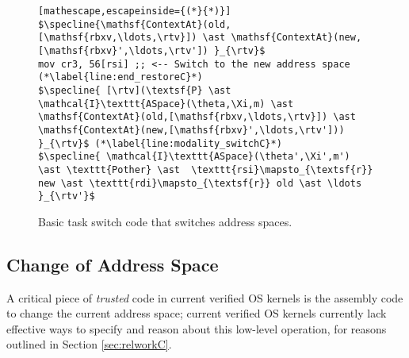 \begin{figure}
\begin{lstlisting}[mathescape,escapeinside={(*}{*)}]
$\specline{\mathsf{ContextAt}(old,[\mathsf{rbxv,\ldots,\rtv}]) \ast \mathsf{ContextAt}(new,[\mathsf{rbxv}',\ldots,\rtv']) }_{\rtv}$
mov cr3, 56[rsi] ;; <-- Switch to the new address space (*\label{line:end_restoreC}*)
$\specline{ [\rtv](\textsf{P} \ast \mathcal{I}\texttt{ASpace}(\theta,\Xi,m) \ast \mathsf{ContextAt}(old,[\mathsf{rbxv,\ldots,\rtv}]) \ast \mathsf{ContextAt}(new,[\mathsf{rbxv}',\ldots,\rtv']))  }_{\rtv}$ (*\label{line:modality_switchC}*)
$\specline{ \mathcal{I}\texttt{ASpace}(\theta',\Xi',m') \ast \texttt{Pother} \ast  \texttt{rsi}\mapsto_{\textsf{r}} new \ast \texttt{rdi}\mapsto_{\textsf{r}} old \ast \ldots }_{\rtv'}$
\end{lstlisting}
\vspace{-1em}
\caption{Basic task switch code that switches address spaces.}
\label{fig:swtchC}
\end{figure}

\subsection{Change of Address Space}
A critical piece of \emph{trusted} code in current verified OS kernels is the assembly code to change the current address space; current verified OS kernels currently
lack effective ways to specify and reason about this low-level operation, for reasons outlined in Section \ref{sec:relworkC}.

